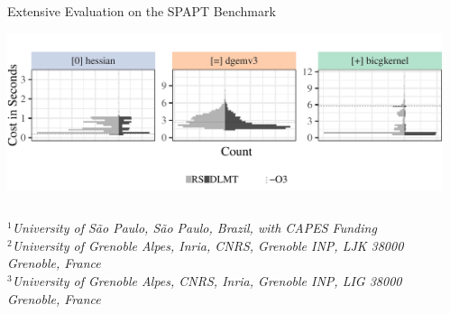 \documentclass[11pt, compress, aspectratio=169, xcolor={table,usenames,dvipsnames}]{beamer}
\begin{document}
\begin{frame}
\begin{columns}
\begin{column}{0.86\columnwidth}
\begin{columns}
\begin{column}[t]{0.5\columnwidth}
\begin{block}{ \vphantom{g}Extensive Evaluation on the SPAPT Benchmark}
\begin{center}
\begin{center}
\includegraphics[width=0.85\columnwidth]{../../../img/split_histograms.pdf}
\end{center}
\end{center}
\end{block}
\end{column}
\end{columns}
\begin{flushleft}
\vspace{1.5em}
  {\small
    \textit{$^{1}$University of São Paulo, São Paulo, Brazil, with CAPES Funding \\
      $^{2}$University of Grenoble Alpes, Inria, CNRS, Grenoble INP, LJK 38000 Grenoble, France \\[-0.2em]
      $^{3}$University of Grenoble Alpes, CNRS, Inria, Grenoble INP, LIG 38000 Grenoble, France
    }
  }
\end{flushleft}
\end{column}
\begin{column}{0.09\columnwidth}
\end{column}
\end{columns}
\end{frame}
\end{document}
